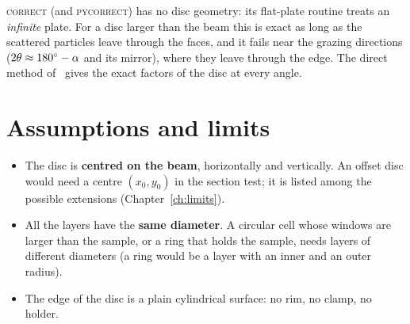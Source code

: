 \begin{note}
\textsc{correct} (and \textsc{pycorrect}) has no disc geometry: its flat-plate routine  treats an \emph{infinite} plate.
For a disc larger than the beam this is exact as long as the scattered particles leave through the faces, and it fails near the
grazing directions ($2\theta\approx 180^\circ-\alpha$ and its mirror), where they leave through the edge. The direct method of
\mcams\ gives the exact factors of the disc at every angle.
\end{note}

\section{Assumptions and limits}

\begin{itemize}
  \item The disc is \textbf{centred on the beam}, horizontally and vertically. An offset disc would need a centre $(x_0, y_0)$ in the
        section test; it is listed among the possible extensions (Chapter~\ref{ch:limits}).
  \item All the layers have the \textbf{same diameter}. A circular cell whose windows are larger than the sample, or a ring that holds
        the sample, needs layers of different diameters (a ring would be a layer with an inner and an outer radius).
  \item The edge of the disc is a plain cylindrical surface: no rim, no clamp, no holder.
\end{itemize}
